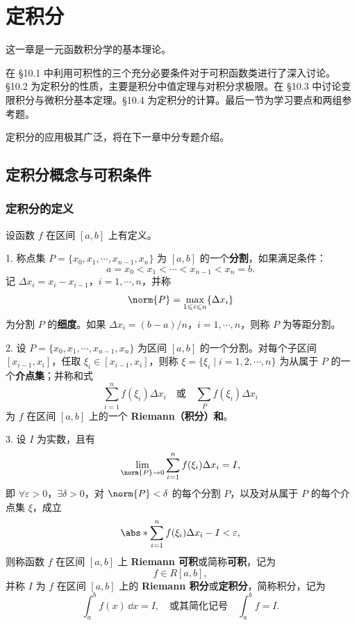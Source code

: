 \chapter{定积分}


这一章是一元函数积分学的基本理论。

在 §10.1 中利用可积性的三个充分必要条件对于可积函数类进行了深入讨论。§10.2 为定积分的性质，主要是积分中值定理与对积分求极限。在 §10.3 中讨论变限积分与微积分基本定理。§10.4 为定积分的计算。最后一节为学习要点和两组参考题。

定积分的应用极其广泛，将在下一章中分专题介绍。

\section{定积分概念与可积条件}

\subsection{定积分的定义}

设函数 $f$ 在区间 $[a,b]$ 上有定义。

1. 称点集 $P=\{x_0,x_1,\cdots,x_{n-1},x_n\}$ 为 $[a,b]$ 的一个\textbf{分割}，如果满足条件：
\[
  a=x_0<x_1<\cdots<x_{n-1}<x_n=b.
\]
记 $\Delta x_i=x_i-x_{i-1}$，$i=1,\cdots,n$，并称
\[
  \norm{P}=\max_{1\leqslant i\leqslant n}\{\Delta x_i\}
\]
为分割 $P$ 的\textbf{细度}。如果 $\Delta x_i=(b-a)/n$，$i=1,\cdots,n$，则称 $P$ 为等距分割。

2. 设 $P=\{x_0,x_1,\cdots,x_{n-1},x_n\}$ 为区间 $[a,b]$ 的一个分割。对每个子区间 $[x_{i-1},x_i]$，任取 $\xi_i\in[x_{i-1},x_i]$，则称 $\xi=\{\xi_i\mid i=1,2,\cdots,n\}$ 为从属于 $P$ 的一个\textbf{介点集}；并称和式
\[
  \sum_{i=1}^n f(\xi_i)\Delta x_i
  \quad\text{或}\quad
  \sum_P f(\xi_i)\Delta x_i
\]
为 $f$ 在区间 $[a,b]$ 上的一个 \textbf{Riemann（积分）和}。

3. 设 $I$ 为实数，且有
\[
  \lim_{\norm{P}\to0}\sum_{i=1}^n f(\xi_i)\Delta x_i=I,
\]
即 $\forall\varepsilon>0$，$\exists\delta>0$，对 $\norm{P}<\delta$ 的每个分割 $P$，以及对从属于 $P$ 的每个介点集 $\xi$，成立
\[
  \abs*{\sum_{i=1}^n f(\xi_i)\Delta x_i-I}<\varepsilon,
\]
则称函数 $f$ 在区间 $[a,b]$ 上 \textbf{Riemann 可积}或简称\textbf{可积}，记为
\[
  f\in R[a,b],
\]
并称 $I$ 为 $f$ 在区间 $[a,b]$ 上的 \textbf{Riemann 积分}或\textbf{定积分}，简称积分，记为
\[
  \int_a^b f(x)\,\dd x=I,
  \quad\text{或其简化记号}\quad
  \int_a^b f=I.
\]

